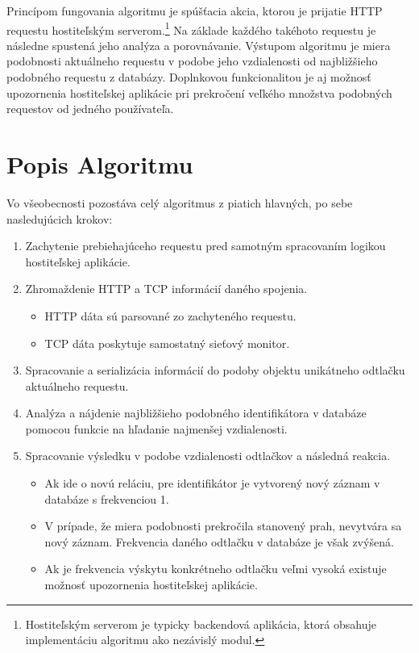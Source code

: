 \documentclass[
  digital, %
  table,   %
  lof,     %
  nolot,   %
  nocover
]{fithesis3}
\begin{document}
Princípom fungovania algoritmu je spúšťacia akcia, ktorou je prijatie HTTP requestu
hostiteľským serverom.\footnote{Hostiteľským serverom je typicky backendová
aplikácia, ktorá obsahuje implementáciu algoritmu ako nezávislý modul.} Na
základe každého takéhoto requestu je následne spustená jeho analýza a
porovnávanie. Výstupom algoritmu je miera podobnosti aktuálneho
requestu v podobe jeho vzdialenosti od najbližšieho podobného requestu
z databázy. Doplnkovou funkcionalitou je aj možnosť upozornenia hostiteľskej
aplikácie pri prekročení veľkého množstva podobných requestov od jedného používateľa.

\section{Popis Algoritmu}
Vo všeobecnosti pozostáva celý algoritmus z piatich hlavných, po sebe nasledujúcich krokov:
\begin{enumerate}
  \item Zachytenie prebiehajúceho requestu pred samotným spracovaním logikou hostiteľskej aplikácie.
  \item Zhromaždenie HTTP a TCP informácií daného spojenia.
  \begin{itemize}
    \item HTTP dáta sú parsované zo zachyteného requestu.
    \item TCP dáta poskytuje samostatný sieťový monitor.
  \end{itemize}
  \item Spracovanie a serializácia informácií do podoby objektu unikátneho odtlačku
  aktuálneho requestu.
  \item Analýza a nájdenie najbližšieho podobného identifikátora v databáze pomocou funkcie na
  hľadanie najmenšej vzdialenosti.
  \item Spracovanie výsledku v podobe vzdialenosti odtlačkov a následná reakcia.
  \begin{itemize}
    \item Ak ide o novú reláciu, pre identifikátor je vytvorený nový záznam v databáze s frekvenciou 1.
    \item V prípade, že miera podobnosti prekročila stanovený prah, nevytvára
    sa nový záznam. Frekvencia daného odtlačku v databáze je však zvýšená.
    \item Ak je frekvencia výskytu konkrétneho odtlačku veľmi vysoká existuje
    možnosť upozornenia hostiteľskej aplikácie.
  \end{itemize}
\end{enumerate}
\end{document}
